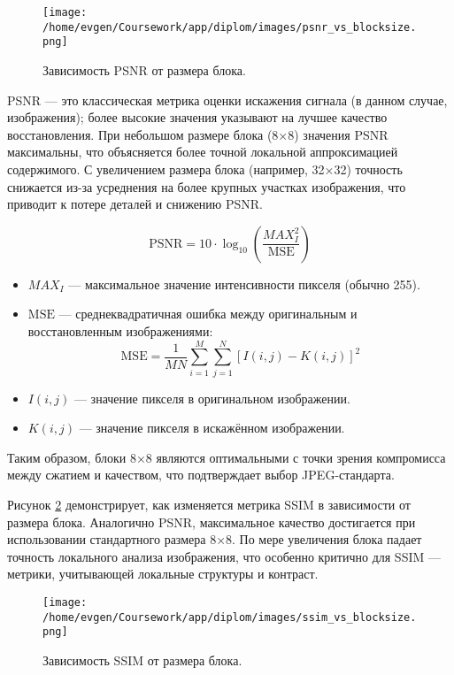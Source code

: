 \begin{figure}[H]
    \centering
    \texttt{[image: /home/evgen/Coursework/app/diplom/images/psnr\_vs\_blocksize.png]}
    \caption{Зависимость PSNR от размера блока.}
    \label{fig:psnr_vs_blocksize}
\end{figure}

PSNR — это классическая метрика оценки искажения сигнала (в данном случае, изображения); 
более высокие значения указывают на лучшее качество восстановления. При небольшом размере блока 
(8×8) значения PSNR максимальны, что объясняется более точной локальной аппроксимацией содержимого. 
С увеличением размера блока (например, 32×32) точность снижается из-за усреднения на более крупных 
участках изображения, что приводит к потере деталей и снижению PSNR.

\begin{equation}
\text{PSNR} = 10 \cdot \log_{10} \left( \frac{MAX_I^2}{\text{MSE}} \right)
\end{equation}


\begin{itemize}
    \item $MAX_I$ — максимальное значение интенсивности пикселя (обычно 255).
    \item $\text{MSE}$ — среднеквадратичная ошибка между оригинальным и восстановленным изображениями:
    \[
    \text{MSE} = \frac{1}{MN} \sum_{i=1}^{M} \sum_{j=1}^{N} \left[ I(i,j) - K(i,j) \right]^2
    \]
    \item $I(i,j)$ — значение пикселя в оригинальном изображении.
    \item $K(i,j)$ — значение пикселя в искажённом изображении.
\end{itemize}



Таким образом, блоки 8×8 являются оптимальными с точки зрения компромисса между сжатием и качеством, 
что подтверждает выбор JPEG-стандарта.

Рисунок \ref{fig:ssim_vs_blocksize} демонстрирует, как изменяется метрика SSIM в зависимости от размера блока. 
Аналогично PSNR, максимальное качество достигается при использовании стандартного размера 8×8. 
По мере увеличения блока падает точность локального анализа изображения, 
что особенно критично для SSIM — метрики, учитывающей локальные структуры и контраст.

\begin{figure}[H]
    \centering
    \texttt{[image: /home/evgen/Coursework/app/diplom/images/ssim\_vs\_blocksize.png]}
    \caption{Зависимость SSIM от размера блока.}
    \label{fig:ssim_vs_blocksize}
\end{figure}

